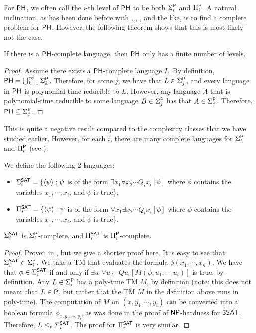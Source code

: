For $\PH$, we often call the $i$-th level of $\PH$ to be both $\Sigma_i^\P$ and $\Pi_i^\P$. A natural inclination, as has been done before with \NP, \PSPACE, \NL, and the like, is to find a complete problem for $\PH$. However, the following theorem shows that this is most likely not the case.

\begin{theorem}
If there is a $\PH$-complete language, then $\PH$ only has a finite number of levels.
\end{theorem}

\begin{proof}
Assume there exists a $\PH$-complete language $L$. By definition, $\PH = \bigcup_{k = 1}^{\infty} \Sigma_k^\P$. Therefore, for some $j$, we have that $L \in \Sigma_j^\P$, and every language in $\PH$ is polynomial-time reducible to $L$. However, any language $A$ that is polynomial-time reducible to some language $B \in \Sigma_j^\P$ has that $A \in \Sigma_j^\P$. Therefore, $\PH \subseteq \Sigma_j^\P$.
\end{proof}

This is quite a negative result compared to the complexity classes that we have studied earlier. However, for each $i$, there are many complete languages for $\Sigma_i^\P$ and $\Pi_i^\P$ (see \cite{Schaefer_completenessin}):
\begin{definition}
We define the following 2 languages:
\begin{itemize}
\item $\Sigma_i^{\SAT} = \{\langle \psi \rangle : \psi$ is of the form $\exists x_1 \forall x_2 \cdots Q_ix_i [\phi]$ where $\phi$ contains the variables $x_1,\cdots,x_i$, and $\psi$ is true\},
\item $\Pi_i^{\SAT} = \{\langle \psi \rangle : \psi$ is of the form $\forall x_1 \exists x_2 \cdots Q_ix_i [\phi]$ where $\phi$ contains the variables $x_1,\cdots,x_i$, and $\psi$ is true\}. 
\end{itemize}
\end{definition}

\begin{theorem}
$\Sigma_i^{\SAT}$ is $\Sigma_i^\P$-complete, and $\Pi_i^{\SAT}$ is $\Pi_i^\P$-complete.
\end{theorem}

\begin{proof}
Proven in \cite{Wrathall197623}, but we give a shorter proof here. It is easy to see that $\Sigma_i^{\SAT} \in \Sigma_i^\P$. We take a TM that evaluates the formula $\phi(x_1, \cdots, x_n)$. We have that $\phi \in \Sigma_i^{\SAT}$ if and only if $\exists u_1 \forall u_2 \cdots Qu_i [M(\phi, u_1, \cdots, u_i)]$ is true, by definition. Any $L \in \Sigma_i^\P$ has a poly-time TM $M$, by definition (note: this does not meant that $L \in \P$, but rather that the TM $M$ in the definition above runs in poly-time). The computation of $M$ on $(x, y_1, \cdots, y_i)$ can be converted into a boolean formula $\phi_{x, y_1, \cdots, y_i}$, as was done in the proof of $\NP$-hardness for $\ThreeSAT$. Therefore, $L \le_p \Sigma_i^\SAT$. The proof for $\Pi_i^{\SAT}$ is very similar.
\end{proof}

